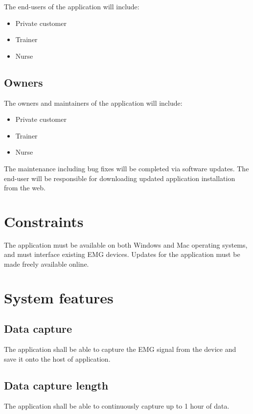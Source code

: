 \documentclass[12pt,a4paper]{article}
\begin{document}
The end-users of the application will include:

\begin{itemize}
	\item Private customer
	\item Trainer
	\item Nurse
\end{itemize}

\subsection{Owners}

The owners and maintainers of the application will include:

\begin{itemize}
	\item Private customer
	\item Trainer 
	\item Nurse
\end{itemize}

The maintenance including bug fixes will be completed via software updates. The end-user will be responsible
for downloading updated application installation from the web.

\section{Constraints}

The application must be available on both Windows and Mac operating systems, and must interface existing EMG devices. Updates for the application must be made freely available online.  

\section{System features}

\subsection{Data capture}

The application shall be able to capture the EMG signal from the device and save it onto the host of application.

\subsection{Data capture length}

The application shall be able to continuously capture up to 1 hour of data.
\end{document}
